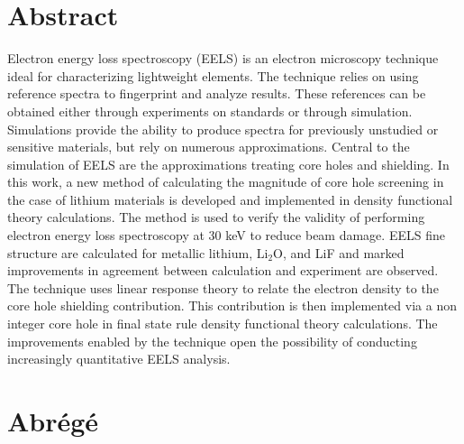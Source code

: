 \documentclass[12pt]{report}
\begin{document}



\renewcommand{\thepage}{\roman{page}}%
 
\tableofcontents





\chapter*{Abstract}



Electron energy loss spectroscopy (EELS) is an electron microscopy technique ideal for characterizing lightweight elements. The technique relies on using reference spectra to fingerprint and analyze results. These references can be obtained either through experiments  on standards or through simulation.  Simulations provide the ability to produce spectra for previously unstudied or sensitive materials, but rely on numerous approximations. Central to the simulation of EELS are the approximations treating core holes and shielding.  In this work, a new method of calculating the magnitude of core hole screening in the case of lithium materials is developed and implemented in density functional theory calculations. The method is used to verify the validity of performing electron energy loss spectroscopy at 30 keV to reduce beam damage.  EELS fine structure are calculated for metallic lithium, $\mathrm{Li_2O}$, and LiF and marked improvements in agreement between calculation and experiment are observed. The technique uses linear response theory to relate the electron density to the core hole shielding contribution.  This contribution is then implemented via a non integer core hole in final state rule density functional theory calculations.  The improvements enabled by the technique open the possibility of conducting increasingly quantitative EELS analysis.
\\

\chapter*{Abr\'eg\'e}

\end{document}
